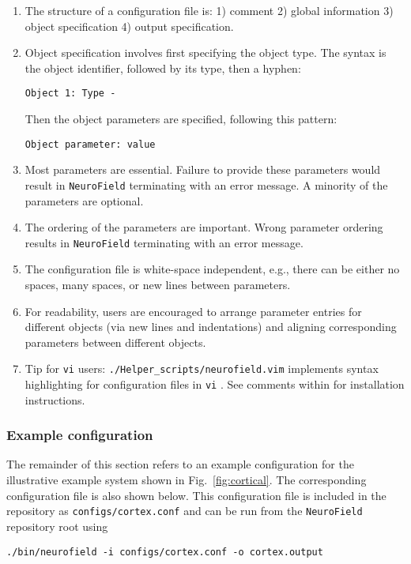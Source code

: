 \documentclass[12pt,a4paper]{article}
\newcommand{\type}[1]{{\small\small\tt #1} }
\newcommand{\NF}[0]{\type{NeuroField}}
\begin{document}
\begin{enumerate}
    \item The structure of a configuration file is: 1) comment 2) global information 3) object specification 4) output specification.
    \item Object specification involves first specifying the object type. The syntax is the object identifier, followed by its type, then a hyphen:
        \begin{lstlisting}
Object 1: Type -
        \end{lstlisting}
        Then the object parameters are specified, following this pattern:
        \begin{lstlisting}
Object parameter: value
        \end{lstlisting}
    \item Most parameters are essential. Failure to provide these parameters would result in \NF terminating with an error message. A minority of the parameters are optional.
    \item The ordering of the parameters are important. Wrong parameter ordering results in \NF terminating with an error message.
    \item The configuration file is white-space independent, e.g., there can be either no spaces, many spaces, or new lines between parameters.
    \item For readability, users are encouraged to arrange parameter entries for different objects (via new lines and indentations) and aligning corresponding parameters between different objects.
    \item Tip for \type{vi} users: \type{./Helper\_scripts/neurofield.vim} implements syntax highlighting for configuration files in \type{vi}. See comments within for installation instructions.
\end{enumerate}

\subsubsection{Example configuration}
The remainder of this section refers to an example configuration for the illustrative example system shown in Fig.~\ref{fig:cortical}. The corresponding configuration file is also shown below. This configuration file is included in the repository as \type{configs/cortex.conf} and can be run from the \NF repository root using

\begin{lstlisting}
./bin/neurofield -i configs/cortex.conf -o cortex.output
\end{lstlisting}
\end{document}
